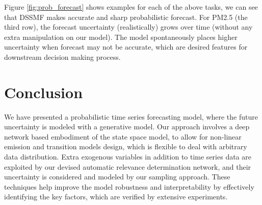 \documentclass{article}
\begin{document}
Figure \ref{fig:prob_forecast} shows examples for each of the above tasks, we can see that DSSMF makes accurate and sharp probabilistic forecast. For PM2.5 (the third row), the forecast uncertainty (realistically) grows over time (without any extra manipulation on our model). The model spontaneously places higher uncertainty when forecast may not be accurate, which are desired features for downstream decision making process.

\section{Conclusion}
We have presented a probabilistic time series forecasting model, where the future uncertainty is modeled with a generative model. Our approach involves a deep network based embodiment of the state space model, to allow for non-linear emission and transition models design, which is flexible to deal with arbitrary data distribution. Extra exogenous variables in addition to time series data are exploited by our devised automatic relevance determination network, and their uncertainty is considered and modeled by our sampling approach. These techniques help improve the model robustness and interpretability by effectively identifying the key factors, which are verified by extensive experiments.

\clearpage
\newpage
{


}
\end{document}
